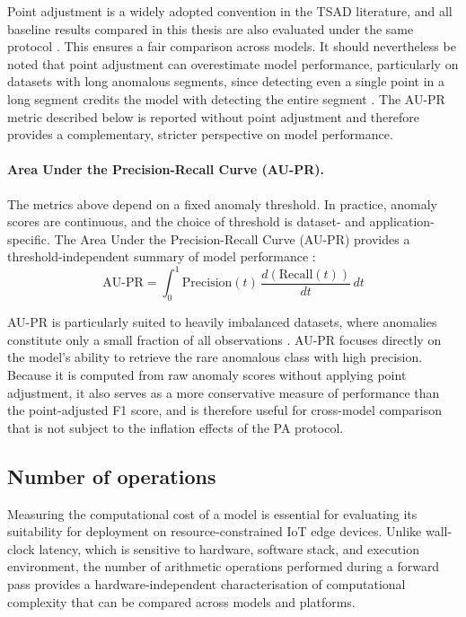 \documentclass[twoside,11pt,openright]{report}
\begin{document}
Point adjustment is a widely adopted convention in the TSAD literature, and all baseline
results compared in this thesis are also evaluated under the same protocol
\cite{xu2022detectionadjustment}. This ensures a fair comparison across
models. It should nevertheless be noted that point adjustment can overestimate model
performance, particularly on datasets with long anomalous segments, since detecting even
a single point in a long segment credits the model with detecting the entire segment
\cite{darban2024carla}. The AU-PR metric described below is reported without point
adjustment and therefore provides a complementary, stricter perspective on model
performance.

\paragraph{Area Under the Precision-Recall Curve (AU-PR).}
The metrics above depend on a fixed anomaly threshold. In practice, anomaly scores are
continuous, and the choice of threshold is dataset- and application-specific. The Area Under
the Precision-Recall Curve (AU-PR) provides a threshold-independent summary of model
performance \cite{darban2024survey}:
\begin{equation}
    \mathrm{AU\text{-}PR} = \int_{0}^{1} \mathrm{Precision}(t)\,
    \frac{d(\mathrm{Recall}(t))}{dt}\, dt
\end{equation}

\noindent AU-PR is particularly suited to heavily imbalanced datasets, where anomalies
constitute only a small fraction of all observations \cite{darban2024survey}. AU-PR focuses 
directly on the model's ability to retrieve the rare anomalous
class with high precision. Because it is computed from raw anomaly scores without applying
point adjustment, it also serves as a more conservative measure of performance than the
point-adjusted F1 score, and is therefore useful for cross-model comparison that is not
subject to the inflation effects of the PA protocol.



\subsection{Number of operations}
\label{subsec:macs}

Measuring the computational cost of a model is essential for evaluating its suitability
for deployment on resource-constrained IoT edge devices. Unlike wall-clock latency,
which is sensitive to hardware, software stack, and execution environment, the number
of arithmetic operations performed during a forward pass provides a hardware-independent
characterisation of computational complexity that can be compared across models and
platforms.
\end{document}
